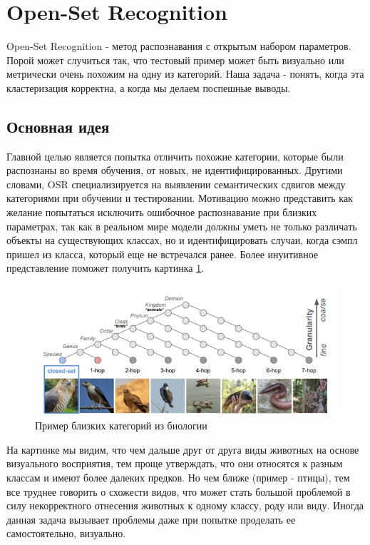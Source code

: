 \section{Open-Set Recognition}

Open-Set Recognition - метод распознавания с открытым набором параметров.
Порой может случиться так, что тестовый пример может быть визуально или метрически очень похожим на одну из категорий.
Наша задача - понять, когда эта кластеризация корректна, а когда мы делаем поспешные выводы.

\subsection{Основная идея}
Главной целью является попытка отличить похожие категории, которые были распознаны во время обучения, от новых, не идентифицированных.
Другими словами, OSR специализируется на выявлении семантических сдвигов между категориями при обучении и тестировании.
Мотивацию можно представить как желание попытаться исключить ошибочное распознавание при близких параметрах, так как в реальном мире модели должны уметь не только различать объекты на существующих классах, но и идентифицировать случаи, когда сэмпл пришел из класса, который еще не встречался ранее.
Более инуитивное представление поможет получить картинка \ref{fig:anomalies-abstract}.

\begin{figure}[ht]
    \centering
    \includegraphics[width=0.8\linewidth]{chapters/anomalies/images/anomalies-abstract.jpg}
    \caption{Пример близких категорий из биологии}
    \label{fig:anomalies-abstract}
\end{figure}

На картинке мы видим, что чем дальше друг от друга виды животных на основе визуального восприятия, тем проще утверждать, что они относятся к разным классам и имеют более далеких предков.
Но чем ближе (пример - птицы), тем все труднее говорить о схожести видов, что может стать большой проблемой в силу некорректного отнесения животных к одному классу, роду или виду.
Иногда данная задача вызывает проблемы даже при попытке проделать ее самостоятельно, визуально.

